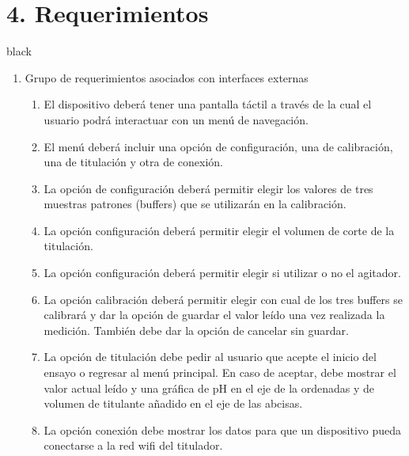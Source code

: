\documentclass[11pt]{charter}
\begin{document}
\section{4. Requerimientos} %
\label{sec:requerimientos}
\begin{consigna}{black}
\begin{enumerate}
\item Grupo de requerimientos asociados con interfaces externas
	\begin{enumerate}
	\item El dispositivo deberá tener una pantalla táctil a través de la cual el usuario podrá interactuar con un menú de navegación.
	\item El menú deberá incluir una opción de configuración, una de calibración, una de titulación y otra de conexión.
	\item La opción de configuración deberá permitir elegir los valores de tres muestras patrones (buffers) que se utilizarán en la calibración.
	\item La opción configuración deberá permitir elegir el volumen de corte de la titulación.
	\item La opción configuración deberá permitir elegir si utilizar o no el agitador.
	\item La opción calibración deberá permitir elegir con cual de los tres buffers se calibrará y dar la opción de guardar el valor leído una vez realizada la medición. También debe dar la opción de cancelar sin guardar.
	\item La opción de titulación debe pedir al usuario que acepte el inicio del ensayo o regresar al menú principal. En caso de aceptar, debe mostrar el valor actual leído y una gráfica de pH en el eje de la ordenadas y de volumen de titulante añadido en el eje de las abcisas.
	\item La opción conexión debe mostrar los datos para que un dispositivo pueda conectarse a la red wifi del titulador. 
	\end{enumerate}
	

\end{enumerate}
\end{consigna}
\end{document}
